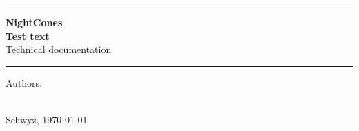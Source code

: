 \begin{titlepage}

    \vspace{4mm}

    \begin{center}
    \end{center} 


    \begin{center}
        \rule{\textwidth}{2pt}
    \end{center}

    \vspace{2mm}

    \begin{center}
      \huge{\textbf{NightCones}}\\
      \LARGE{\textbf{Test text}}\\
        \vspace{4mm}
        \Large{Technical documentation}
    \end{center}
    

    \begin{center}
        \rule{\textwidth}{2pt}
    \end{center}

    \vspace{4mm}

    \begin{center}
        Authors:\\
        \large{\makeatletter \@author \makeatother}\\
        \vspace{4mm}
    \end{center}

    \vspace{3mm}

    \begin{center}
        Schwyz, \today
    \end{center}

\end{titlepage}
\clearpage
